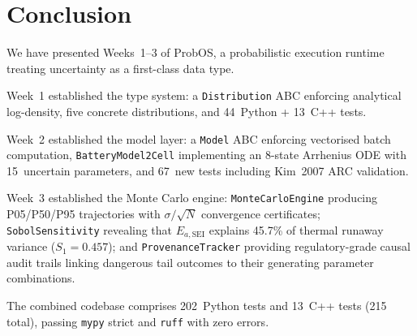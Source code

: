 \documentclass[12pt,a4paper]{article}
\theoremstyle{plain}
\theoremstyle{definition}
\theoremstyle{remark}
\begin{document}
\section{Conclusion}

We have presented Weeks~1--3 of ProbOS, a probabilistic execution
runtime treating uncertainty as a first-class data type.

Week~1 established the type system: a \texttt{Distribution} ABC
enforcing analytical log-density, five concrete distributions, and
44~Python + 13~C++ tests.

Week~2 established the model layer: a \texttt{Model} ABC enforcing
vectorised batch computation, \texttt{BatteryModel2Cell} implementing
an 8-state Arrhenius ODE with 15~uncertain parameters, and 67~new tests
including Kim~2007 ARC validation.

Week~3 established the Monte Carlo engine: \texttt{MonteCarloEngine}
producing P05/P50/P95 trajectories with $\sigma/\sqrt{N}$ convergence
certificates; \texttt{SobolSensitivity} revealing that $E_{a,\text{SEI}}$
explains 45.7\% of thermal runaway variance ($S_1 = 0.457$);
and \texttt{ProvenanceTracker} providing regulatory-grade causal
audit trails linking dangerous tail outcomes to their generating
parameter combinations.

The combined codebase comprises 202~Python tests and 13~C++ tests (215 total),
passing \texttt{mypy} strict and \texttt{ruff} with zero errors.



\end{document}
